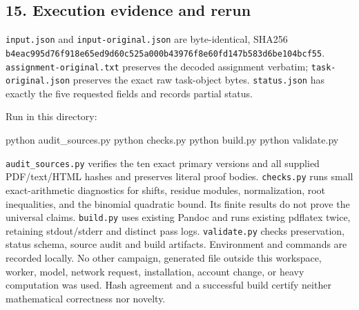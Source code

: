 \documentclass[
  11pt,
]{article}
\newenvironment{Shaded}{}{}
\newcommand{\ExtensionTok}[1]{#1}
\newcommand{\NormalTok}[1]{#1}
\begin{document}
\subsection{15. Execution evidence and
rerun}\label{execution-evidence-and-rerun}

\texttt{input.json} and \texttt{input-original.json} are byte-identical,
SHA256
\texttt{b4eac995d76f918e65ed9d60c525a000b43976f8e60fd147b583d6be104bcf55}.
\texttt{assignment-original.txt} preserves the decoded assignment
verbatim; \texttt{task-original.json} preserves the exact raw
task-object bytes. \texttt{status.json} has exactly the five requested
fields and records partial status.

Run in this directory:

\begin{Shaded}
\begin{Highlighting}[]
\ExtensionTok{python}\NormalTok{ audit\_sources.py}
\ExtensionTok{python}\NormalTok{ checks.py}
\ExtensionTok{python}\NormalTok{ build.py}
\ExtensionTok{python}\NormalTok{ validate.py}
\end{Highlighting}
\end{Shaded}

\texttt{audit\_sources.py} verifies the ten exact primary versions and
all supplied PDF/text/HTML hashes and preserves literal proof bodies.
\texttt{checks.py} runs small exact-arithmetic diagnostics for shifts,
residue modules, normalization, root inequalities, and the binomial
quadratic bound. Its finite results do not prove the universal claims.
\texttt{build.py} uses existing Pandoc and runs existing pdflatex twice,
retaining stdout/stderr and distinct pass logs. \texttt{validate.py}
checks preservation, status schema, source audit and build artifacts.
Environment and commands are recorded locally. No other campaign,
generated file outside this workspace, worker, model, network request,
installation, account change, or heavy computation was used. Hash
agreement and a successful build certify neither mathematical
correctness nor novelty.
\end{document}
